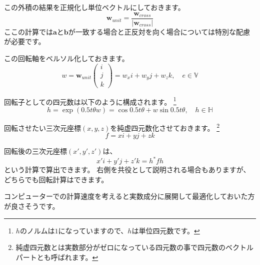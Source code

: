 \documentclass[a4paper,12pt]{jsreport}
\begin{document}
この外積の結果を正規化し単位ベクトルにしておきます。
\begin{equation}
\bm{w}_{unit}=\frac{\bm{w}_{cross}}{|\bm{w}_{cross}|}
\end{equation}
ここの計算では$\bm{a}$と$\bm{b}$が一致する場合と正反対を向く場合については特別な配慮が必要です。

この回転軸をベルソル化しておきます。
\begin{equation}
w=\bm{w}_{unit}\begin{pmatrix}i\\j\\k\end{pmatrix}=w_xi+w_yj+w_zk,\quad e\in\mathbb{V}
\end{equation}

回転子としての四元数は以下のように構成されます。
\footnote{$h$のノルムは$1$になっていますので、$h$は単位四元数です。}
\begin{equation}
h=\exp(0.5t\theta w)=\cos 0.5t\theta+w\sin 0.5t\theta,\quad h\in\mathbb{H}
\end{equation}

回転させたい三次元座標$(x,y,z)$を純虚四元数化させておきます。
\footnote{純虚四元数とは実数部分がゼロになっている四元数の事で四元数のベクトルパートとも呼ばれます。}
\begin{equation}
f=xi+yj+zk
\end{equation}

回転後の三次元座標$(x',y',z')$は、
\begin{equation}
x'i+y'j+z'k=h^*fh
\end{equation}
という計算で算出できます。
右側を共役として説明される場合もありますが、どちらでも回転計算はできます。

コンピューターでの計算速度を考えると実数成分に展開して最適化しておいた方が良さそうです。
\end{document}
